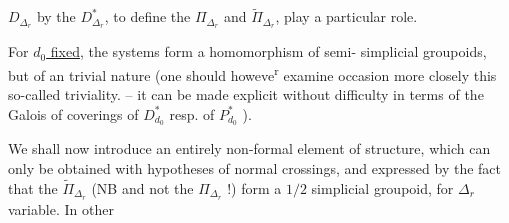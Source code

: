 $D_{\Delta_r}$ by the $D^*_{\Delta_r}$, to define the
$\Pi_{\Delta_r}$ and $\widetilde\Pi_{\Delta_r}$, 
 play a particular role.

For \uline{$d_0$ fixed}, the systems
form a homomorphism of semi-
simplicial groupoids, but of an 
trivial nature (one should howeve\textsuperscript{r} examine
 occasion more closely this so-called
triviality. --  it can be made explicit without difficulty
in terms of the Galois 
of coverings of $D^*_{d_0}$ resp. of $P^*_{d_0}$ \unsure{\ldots|--}).

We shall now introduce
an entirely non-formal element of
structure, which can only be obtained
with hypotheses 
of normal crossings, and expressed
by the fact that the $\widetilde\Pi_{\Delta_r}$ (NB and
not the $\Pi_{\Delta_r}$ !) form a
$1/2$ simplicial groupoid, for $\Delta_r$ variable. In other
